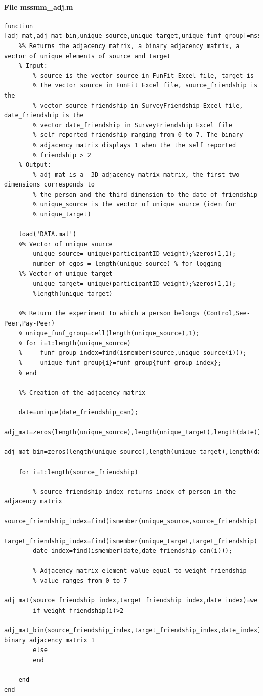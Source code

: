 \documentclass[11pt]{article}
\begin{document}
\paragraph{File mssmm\_adj.m}
\begin{verbatim}
function [adj_mat,adj_mat_bin,unique_source,unique_target,unique_funf_group]=mssmm_adj(source,target,source_friendship,date_friendship_can)
    %% Returns the adjacency matrix, a binary adjacency matrix, a vector of unique elements of source and target
    % Input: 
        % source is the vector source in FunFit Excel file, target is
        % the vector source in FunFit Excel file, source_friendship is the
        % vector source_friendship in SurveyFriendship Excel file, date_friendship is the
        % vector date_friendship in SurveyFriendship Excel file
        % self-reported friendship ranging from 0 to 7. The binary
        % adjacency matrix displays 1 when the the self reported
        % friendship > 2
    % Output:
        % adj_mat is a  3D adjacency matrix matrix, the first two dimensions corresponds to
        % the person and the third dimension to the date of friendship
        % unique_source is the vector of unique source (idem for
        % unique_target)
    
    load('DATA.mat')
    %% Vector of unique source
        unique_source= unique(participantID_weight);%zeros(1,1);
        number_of_egos = length(unique_source) % for logging
    %% Vector of unique target
        unique_target= unique(participantID_weight);%zeros(1,1);
        %length(unique_target)
        
    %% Return the experiment to which a person belongs (Control,See-Peer,Pay-Peer)
    % unique_funf_group=cell(length(unique_source),1);
    % for i=1:length(unique_source)    
    %     funf_group_index=find(ismember(source,unique_source(i)));
    %     unique_funf_group{i}=funf_group{funf_group_index};
    % end
       
    %% Creation of the adjacency matrix
 
    date=unique(date_friendship_can);
    adj_mat=zeros(length(unique_source),length(unique_target),length(date));
    adj_mat_bin=zeros(length(unique_source),length(unique_target),length(date));

    for i=1:length(source_friendship)

        % source_friendship_index returns index of person in the adjacency matrix
        source_friendship_index=find(ismember(unique_source,source_friendship(i)));
        target_friendship_index=find(ismember(unique_target,target_friendship(i)));
        date_index=find(ismember(date,date_friendship_can(i)));

        % Adjacency matrix element value equal to weight_friendship
        % value ranges from 0 to 7
        adj_mat(source_friendship_index,target_friendship_index,date_index)=weight_friendship(i);
        if weight_friendship(i)>2
            adj_mat_bin(source_friendship_index,target_friendship_index,date_index)=1;% binary adjacency matrix 1
        else
        end

    end
end

\end{verbatim}
\end{document}
